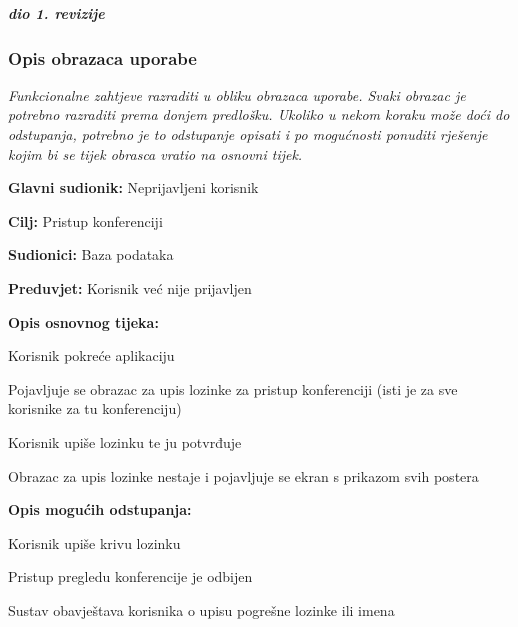 				\textbf{\textit{dio 1. revizije}}
				
				\subsubsection{Opis obrazaca uporabe}
					\textit{Funkcionalne zahtjeve razraditi u obliku obrazaca uporabe. Svaki obrazac je potrebno razraditi prema donjem predlošku. Ukoliko u nekom koraku može doći do odstupanja, potrebno je to odstupanje opisati i po mogućnosti ponuditi rješenje kojim bi se tijek obrasca vratio na osnovni tijek.}\\
					
					\setcounter{UseCaseCounter}{1}
					
					\noindent {}
					\begin{packed_item}
	
						\item \textbf{Glavni sudionik: } Neprijavljeni korisnik
						\item  \textbf{Cilj:} Pristup konferenciji
						\item  \textbf{Sudionici:} Baza podataka
						\item  \textbf{Preduvjet:} Korisnik već nije prijavljen
						\item  \textbf{Opis osnovnog tijeka:}
						
						\item[] \begin{packed_enum}
	
							\item Korisnik pokreće aplikaciju
							\item Pojavljuje se obrazac za upis lozinke za pristup konferenciji (isti je za sve korisnike za tu konferenciju)
							\item Korisnik upiše lozinku te ju potvrđuje
							\item Obrazac za upis lozinke nestaje i pojavljuje se ekran s prikazom svih postera
						\end{packed_enum}
						
						\item  \textbf{Opis mogućih odstupanja:}
						
						\item[] \begin{packed_item}
	
							\item[3.a] Korisnik upiše krivu lozinku
							\item[] \begin{packed_enum}
								
								\item Pristup pregledu konferencije je odbijen
								\item Sustav obavještava korisnika o upisu pogrešne lozinke ili imena
								
							\end{packed_enum}
							
						\end{packed_item}
					\end{packed_item}
					
